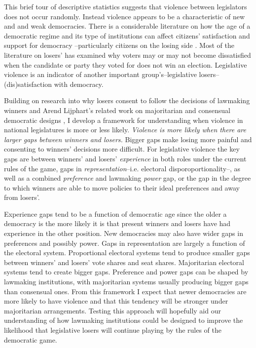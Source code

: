 \documentclass[a4paper]{article}\usepackage{graphicx, color}
\begin{document}
This brief tour of descriptive statistics suggests that violence between legislators does not occur randomly. Instead violence appears to be a characteristic of new and and weak democracies. There is a considerable literature on how the age of a democratic regime and its type of institutions can affect citizens' satisfaction and support for democracy \citep{Aarts2008, lijphart1999, Norris1999, Wagner2009}--particularly citizens on the losing side \citep{Anderson1997, Anderson2001, Anderson2005, Bernauer2011, Blais2007}. Most of the literature on losers' has examined why voters may or may not become dissatisfied when the candidate or party they voted for does not win an election. Legislative violence is an indicator of another important group's--legislative losers--(dis)satisfaction with democracy. 

Building on research into why losers consent to follow the decisions of lawmaking winners and Arend Lijphart's related work on majoritarian and consensual democratic designs \citeyearpar{Lijphart1977, Lijphart1984, Lijphart1991, lijphart1999, Lijphart2003, Lijphart2004}, I develop a framework for understanding when violence in national legislatures is more or less likely. {\emph{Violence is more likely when there are larger gaps between winners and losers.}} Bigger gaps make losing more painful and consenting to winners' decisions more difficult. For legislative violence the key gaps are between winners' and losers' {\emph{experience}} in both roles under the current rules of the game, gaps in {\emph{representation}}--i.e. electoral disporoportionality--, as well as a combined {\emph{preference}} and lawmaking \emph{power} gap, or the gap in the degree to which winners are able to move policies to their ideal preferences and away from losers'. 

Experience gaps tend to be a function of democratic age since the older a democracy is the more likely it is that present winners and losers have had experience in the other position. New democracies may also have wider gaps in preferences and possibly power. Gaps in representation are largely a function of the electoral system. Proportional electoral systems tend to produce smaller gaps between winners' and losers' vote shares and seat shares. Majoritarian electoral systems tend to create bigger gaps. Preference and power gaps can be shaped by lawmaking institutions, with majoritarian systems usually producing bigger gaps than consensual ones. From this framework I expect that newer democracies are more likely to have violence and that this tendency will be stronger under majoritarian arrangements. Testing this approach will hopefully aid our understanding of how lawmaking institutions could be designed to improve the likelihood that legislative losers will continue playing by the rules of the democratic game.
\end{document}
